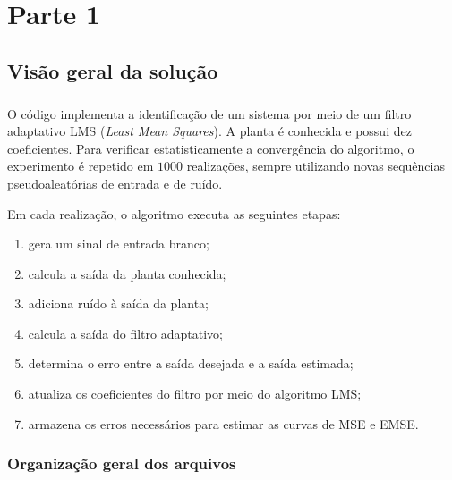 \documentclass[11pt,a4paper,oneside]{report}
\begin{document}
\thispagestyle{fancy}
\tableofcontents
\vfill

\clearpage


\chapter{Parte 1}

\section{Visão geral da solução}

\paragraph{} O código implementa a identificação de um sistema por meio de um
filtro adaptativo LMS (\textit{Least Mean Squares}). A planta é
conhecida e possui dez coeficientes. Para verificar estatisticamente a
convergência do algoritmo, o experimento é repetido em
\(1000\) realizações, sempre utilizando novas sequências pseudoaleatórias
de entrada e de ruído.

Em cada realização, o algoritmo executa as seguintes etapas:

\begin{enumerate}[label=\arabic*., leftmargin=*, itemsep=0.3em]
    \item gera um sinal de entrada branco;
    \item calcula a saída da planta conhecida;
    \item adiciona ruído à saída da planta;
    \item calcula a saída do filtro adaptativo;
    \item determina o erro entre a saída desejada e a saída estimada;
    \item atualiza os coeficientes do filtro por meio do algoritmo LMS;
    \item armazena os erros necessários para estimar as curvas de
    MSE e EMSE.
\end{enumerate}

\subsection{Organização geral dos arquivos}
\end{document}
